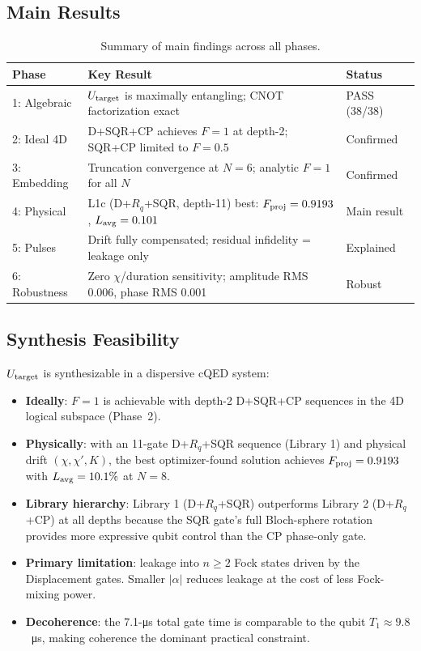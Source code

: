 \documentclass[11pt,a4paper]{article}
\newcommand{\Fproj}{F_{\rm proj}}
\newcommand{\Lavg}{L_{\rm avg}}
\newcommand{\Utarget}{U_{\rm target}}
\begin{document}
\subsection{Main Results}

\begin{table}[H]
  \centering
  \caption{Summary of main findings across all phases.}
  \label{tab:summary}
  \begin{tabular}{lll}
    \toprule
    Phase & Key Result & Status \\
    \midrule
    1: Algebraic & $\Utarget$ is maximally entangling;
      CNOT factorization exact & \textcolor{green!60!black}{PASS (38/38)} \\
    2: Ideal 4D  & D+SQR+CP achieves $F=1$ at depth-2;
      SQR+CP limited to $F=0.5$ & Confirmed \\
    3: Embedding & Truncation convergence at $N=6$;
      analytic $F=1$ for all $N$ & Confirmed \\
    4: Physical  & L1c (D+$R_q$+SQR, depth-11) best: $\Fproj=0.9193$, $\Lavg=0.101$
      & Main result \\
    5: Pulses    & Drift fully compensated; residual
      infidelity = leakage only & Explained \\
    6: Robustness & Zero $\chi$/duration sensitivity;
      amplitude RMS 0.006, phase RMS 0.001 & Robust \\
    \bottomrule
  \end{tabular}
\end{table}

\subsection{Synthesis Feasibility}

$\Utarget$ is synthesizable in a dispersive cQED system:
\begin{itemize}
  \item \textbf{Ideally}: $F=1$ is achievable with depth-2 D+SQR+CP sequences
        in the 4D logical subspace (Phase~2).
  \item \textbf{Physically}: with an 11-gate D+$R_q$+SQR sequence (Library 1)
        and physical drift $(\chi,\chi',K)$, the best optimizer-found solution
        achieves $\Fproj=0.9193$ with $\Lavg=10.1\%$ at $N=8$.
  \item \textbf{Library hierarchy}: Library 1 (D+$R_q$+SQR) outperforms
        Library 2 (D+$R_q$+CP) at all depths because the SQR gate's full
        Bloch-sphere rotation provides more expressive qubit control than
        the CP phase-only gate.
  \item \textbf{Primary limitation}: leakage into $n\geq 2$ Fock states driven
        by the Displacement gates.  Smaller $|\alpha|$ reduces leakage at the
        cost of less Fock-mixing power.
  \item \textbf{Decoherence}: the 7.1-\si{\micro s} total gate time is
        comparable to the qubit $T_1\approx9.8$~\si{\micro s}, making coherence
        the dominant practical constraint.
\end{itemize}
\end{document}
